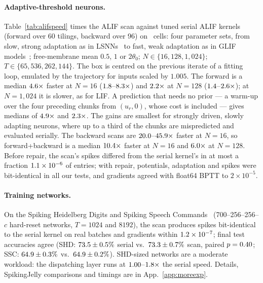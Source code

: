 \documentclass[10pt]{article}
\theoremstyle{remark}
\begin{document}
\paragraph{Adaptive-threshold neurons.}
Table~\ref{tab:alifspeed} times the ALIF scan against tuned serial ALIF kernels (forward over 60 tilings, backward over 96) on \AlifCells\ cells: four parameter sets, from slow, strong adaptation as in LSNNs~\citep{bellec2018lsnn} to fast, weak adaptation as in GLIF models~\citep{teeter2018glif}; free-membrane mean $0.5$, $1$ or $2\theta_0$; $N\in\{16,128,1{,}024\}$; $T\in\{65{,}536,262{,}144\}$. The box is centred on the previous iterate of a fitting loop, emulated by the trajectory for inputs scaled by $1.005$. The forward is a median $4.6\times$ faster at $N=16$ ($1.8$--$8.3\times$) and $2.2\times$ at $N=128$ ($1.4$--$2.6\times$); at $N=1{,}024$ it is slower, as for LIF. A prediction that needs no prior --- a warm-up over the four preceding chunks from $(u_r,0)$, whose cost is included --- gives medians of $4.9\times$ and $2.3\times$. The gains are smallest for strongly driven, slowly adapting neurons, where up to a third of the chunks are mispredicted and evaluated serially. The backward scans are $20.0$--$45.9\times$ faster at $N=16$, so forward+backward is a median $10.4\times$ faster at $N=16$ and $6.0\times$ at $N=128$. Before repair, the scan's spikes differed from the serial kernel's in at most a fraction $1.1\times10^{-6}$ of entries; with repair, potentials, adaptation and spikes were bit-identical in all our tests, and gradients agreed with float64 BPTT to $2\times10^{-5}$.

\begin{table}[t]
\centering\small
\setlength{\tabcolsep}{4pt}

\caption{ALIF: exact scan with a predicted adaptation box vs.\ tuned serial ALIF kernels (RTX~5090, previous-iterate prediction, each implementation tuned per cell). Ranges over the free-membrane mean ($0.5$, $1$, $2\theta_0$) and $T\in\{65{,}536,262{,}144\}$. ``Mispredicted'': fraction of chunks whose entry state fell outside its box ($N\le128$).}
\label{tab:alifspeed}
\end{table}

\paragraph{Training networks.}
On the Spiking Heidelberg Digits and Spiking Speech Commands~\citep{cramer2020shd} (700--256--256--$c$ hard-reset networks, $T=1024$ and $8192$), the scan produces spikes bit-identical to the serial kernel on real batches and gradients within $1.2\times10^{-7}$; final test accuracies agree (SHD: $73.5\pm0.5\%$ serial vs.\ $73.3\pm0.7\%$ scan, paired $p=0.40$; SSC: $64.9\pm0.3\%$ vs.\ $64.9\pm0.2\%$). SHD-sized networks are a moderate workload: the dispatching layer runs at $1.00$--$1.8\times$ the serial speed. Details, SpikingJelly comparisons and timings are in App.~\ref{app:moreexp}.
\end{document}
